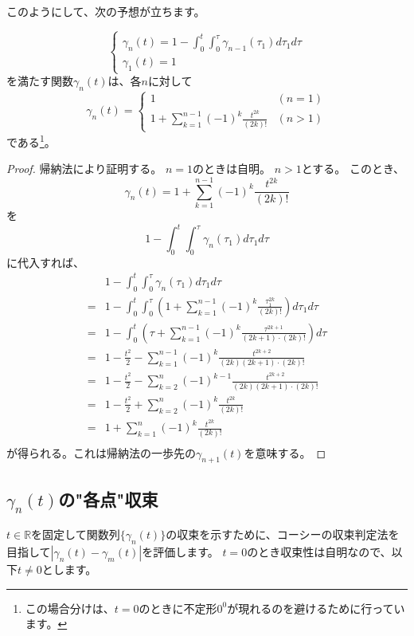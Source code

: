 このようにして、次の予想が立ちます。
\begin{lemma}
  \[
    \begin{cases}
      \displaystyle \gamma_n(t)=1-\int_0^t\int_0^{\tau}\gamma_{n-1}(\tau_1)d\tau_1d\tau\\
      \gamma_1(t)=1
    \end{cases}
  \]
  を満たす関数$\gamma_n(t)$は、各$n$に対して
  \[
    \gamma_n(t)=\begin{cases}
      1 & (n=1) \\
      \displaystyle 1+\sum_{k=1}^{n-1}(-1)^k\frac{t^{2k}}{(2k)!} & (n>1)
    \end{cases}
  \]
  である\footnote{
    この場合分けは、$t=0$のときに不定形$0^0$が現れるのを避けるために行っています。
  }。
\end{lemma}
\begin{proof}
  帰納法により証明する。
  $n=1$のときは自明。
  $n>1$とする。
  このとき、
  \[
    \gamma_n(t)=1+\sum_{k=1}^{n-1}(-1)^k\frac{t^{2k}}{(2k)!}
  \]
  を
  \[
    1-\int_0^t\int_0^{\tau}\gamma_{n}(\tau_1)d\tau_1d\tau
  \]
  に代入すれば、
  \begin{align*}
    &1-\int_0^t\int_0^{\tau}\gamma_{n}(\tau_1)d\tau_1d\tau\\
    =&1-\int_0^t\int_0^{\tau}\left(1+\sum_{k=1}^{n-1}(-1)^k\frac{\tau_1^{2k}}{(2k)!}\right)d\tau_1d\tau\\
    =&1-\int_0^t\left(\tau+\sum_{k=1}^{n-1}(-1)^k\frac{\tau^{2k+1}}{(2k+1)\cdot(2k)!}\right)d\tau\\
    =&1-\frac{t^2}{2}-\sum_{k=1}^{n-1}(-1)^k\frac{t^{2k+2}}{(2k)(2k+1)\cdot(2k)!}\\
    =&1-\frac{t^2}{2}-\sum_{k=2}^{n}(-1)^{k-1}\frac{t^{2k+2}}{(2k)(2k+1)\cdot(2k)!}\\
    =&1-\frac{t^2}{2}+\sum_{k=2}^{n}(-1)^{k}\frac{t^{2k}}{(2k)!}\\
    =&1+\sum_{k=1}^{n}(-1)^{k}\frac{t^{2k}}{(2k)!}\\
  \end{align*}
  が得られる。これは帰納法の一歩先の$\gamma_{n+1}(t)$を意味する。
\end{proof}

\subsection{$\gamma_n(t)$の"各点"収束}

$t\in\mathbb{R}$を固定して関数列$\{\gamma_n(t)\}$の収束を示すために、コーシーの収束判定法を目指して$|\gamma_n(t)-\gamma_m(t)|$を評価します。
$t=0$のとき収束性は自明なので、以下$t\neq0$とします。

